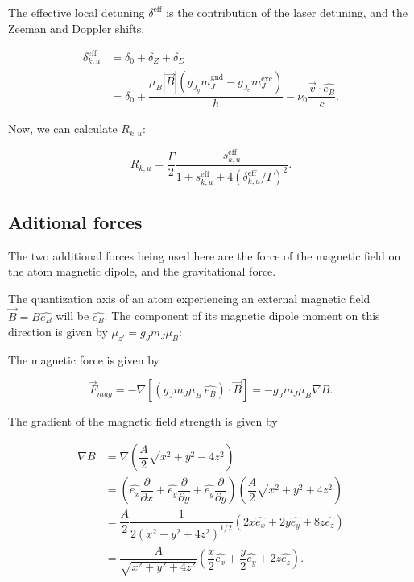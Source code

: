\documentclass[12pt,a4paper,twoside]{article}
\begin{document}
The effective local detuning $\delta^{\mathrm{eff}}$ is the contribution of the laser detuning, and the Zeeman and Doppler shifts.

\begin{align}
	\delta_{k,u}^{\mathrm{eff}} &= \delta_0 + \delta_Z + \delta_D \nonumber
	\\
	&= \delta_0 +
	\dfrac{\mu_B \left|\vec{B}\right| (g_{J_g} m_J^{\mathrm{gnd}} - g_{J_e} m_J^{\mathrm{exc}})}{h}
	- \nu_0\dfrac{\vec{v}\cdot{\hat{e_B}}}{c}.
	\label{eq.effdetuning}
\end{align}


Now, we can calculate $R_{k,u}$:

\begin{equation}
	R_{k,u} = \dfrac{\Gamma}{2}\dfrac{s_{k,u}^{\mathrm{eff}}}{1 + s_{k,u}^{\mathrm{eff}} + 4\left(\delta_{k,u}^{\mathrm{eff}} / \Gamma \right)^2}.
	\label{eq.scattrate}
\end{equation}


\subsection{Aditional forces}

The two additional forces being used here are the force of the magnetic field on the atom magnetic dipole, and the gravitational force.

The quantization axis of an atom experiencing an external magnetic field $\vec{B} = B\hat{e_B}$ will be $\hat{e_B}$. The component of its magnetic dipole moment on this direction is given by $\mu_{z'} = g_J m_J \mu_B$:

The magnetic force is given by \cite{berglund2008narrow}

\begin{equation}
	\vec{F}_{mag} = -\nabla \left[ \left(g_J m_J \mu_B\ \hat{e_B}\right) \cdot\vec{B} \right] = - g_J m_J \mu_B \nabla B.
\end{equation}

\noindent
The gradient of the magnetic field strength is given by

\begin{align}
	\nabla B &= \nabla \left( \dfrac{A}{2}\sqrt{x^2 + y^2 - 4z^2} \right) \nonumber \\
	&= \left( \hat{e_x}\dfrac{\partial}{\partial x} + \hat{e_y}\dfrac{\partial}{\partial y} + \hat{e_y}\dfrac{\partial}{\partial y} \right) \left( \dfrac{A}{2}\sqrt{x^2 + y^2 + 4z^2} \right) \nonumber \\
	&= \dfrac{A}{2} \dfrac{1}{2\left( x^2 + y^2 + 4z^2 \right)^{1/2}} \left( 2x\hat{e_x} + 2y\hat{e_y} + 8z\hat{e_z}\right) \nonumber \\
	& = \dfrac{A}{\sqrt{x^2 + y^2 + 4z^2}} \left( \dfrac{x}{2}\hat{e_x} + \dfrac{y}{2}\hat{e_y} + 2z\hat{e_z}\right).
\end{align}
\end{document}
